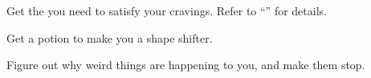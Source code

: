 \documentclass[char]{NeptuneBall}
\begin{document}
\begin{itemz}[Goals]
  \item Get the \iDrug{} you need to satisfy your cravings. Refer to ``\gAddicted{}'' for details.
  \item Get a potion to make you a shape shifter.
	\item Figure out why weird things are happening to you, and make them stop.
\end{itemz}

%
%
%
%
%
\end{document}

